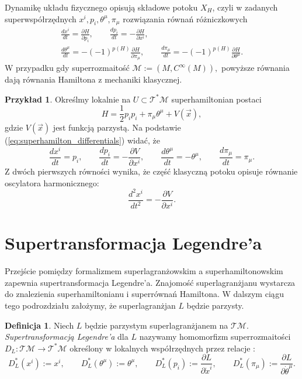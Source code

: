 \documentclass[11pt,a4paper]{report}
\theoremstyle{definition}
\newtheorem{example}[theorem]{Przykład}
\newtheorem{definition}[theorem]{Definicja}
\begin{document}
Dynamikę układu fizycznego opisują składowe potoku $X_H$, czyli w zadanych superwspółrzędnych $x^i, p_i, \theta^\mu, \pi_\mu$ rozwiązania równań różniczkowych
 \begin{equation}
 \label{eq:superhamilton_differentials}
  \begin{gathered}
   \frac{dx^i}{dt} = \frac{\partial H}{\partial p_i}, \qquad
   \frac{dp_i}{dt} = -\frac{\partial H}{\partial x^i}, \\
   \frac{d\theta^\mu}{dt} = -(-1)^{p(H)} \frac{\partial H}{\partial \pi_\mu}, \qquad
   \frac{d\pi_\mu}{dt} = -(-1)^{p(H)} \frac{\partial H}{\partial \theta^\mu}.
  \end{gathered}
 \end{equation}
W przypadku gdy superrozmaitość $\mathcal{M} := (M, C^\infty (M)),$ powyższe równania dają równania Hamiltona z mechaniki klasycznej.

\begin{example}
  Określmy lokalnie na $U \subset \mathcal{T^*M}$ superhamiltonian postaci
 \begin{equation*}
  H = \frac12 p_i p_i + \pi_\mu \theta^\mu + V(\overrightarrow{x}),
 \end{equation*}
 gdzie $V(\overrightarrow{x})$ jest funkcją parzystą. Na podstawie (\ref{eq:superhamilton_differentials}) widać, że
 \begin{equation*}
   \frac{dx^i}{dt} = p_i, \qquad
   \frac{dp_i}{dt} = -\frac{\partial V}{\partial x^i}, \qquad
   \frac{d\theta^\mu}{dt} = -\theta^\mu, \qquad
   \frac{d\pi_\mu}{dt} = \pi_\mu.
 \end{equation*}
 Z dwóch pierwszych równości wynika, że część klasyczną potoku opisuje równanie oscylatora harmonicznego:
 \begin{equation*}
 \frac{d^2 x^i}{dt^2} = - \frac{\partial V}{\partial x^i}.
 \end{equation*}
\end{example}

\section{Supertransformacja Legendre'a}

Przejście pomiędzy formalizmem superlagranżowskim a superhamiltonowskim zapewnia supertransformacja Legendre'a. Znajomość superlagranżjanu wystarcza do znalezienia superhamiltonianu i superrównań Hamiltona. W dalszym ciągu tego podrozdziału założymy, że superlagranżjan $L$ będzie parzysty.

\begin{definition}
 Niech $L$ będzie parzystym superlagranżjanem na $\mathcal{TM}$. \textit{Supertransformacją Legendre'a} dla $L$ nazywamy homomorfizm superrozmaitości $D_L: \mathcal{TM} \rightarrow \mathcal{T^*M}$ określony w lokalnych współrzędnych przez relacje \cite{carinena}:
 \begin{equation}
 \label{eq:legendre_images}
  D_L^*(x^i) := x^i, \qquad D_L^*(\theta^\mu) := \theta^\mu, 
  \qquad D_L^*(p_i) := \frac{\partial L}{\partial \dot x^i}, 
  \qquad D_L^*(\pi_\mu) := \frac{\partial L}{\partial \dot \theta^\mu}.
 \end{equation}
\end{definition}
\end{document}
